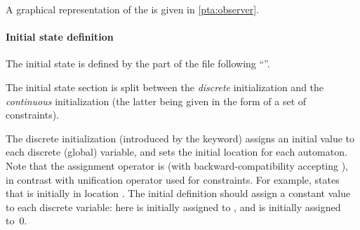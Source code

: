 A graphical representation of the \IPTA{}  is given in \cref{pta:observer}.


\paragraph{Initial state definition}

The initial state is defined by the part of the file following ``''.

The initial state section is split between the \emph{discrete} initialization and the \emph{continuous} initialization (the latter being given in the form of a set of constraints).


The discrete initialization (introduced by the  keyword) assigns an initial value to each discrete (global) variable, and sets the initial location for each automaton.
Note that the assignment operator is \styleIMI{<-} (with backward-compatibility accepting \styleIMI{:=}), in contrast with unification operator \styleIMI{=} used for constraints.
%
%
For example,  states that  is initially in location .
The initial definition should assign a constant value to each discrete variable:
here  is initially assigned to , and  is initially assigned to~0.

